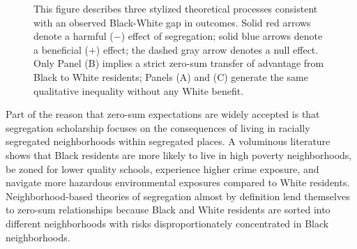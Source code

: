 \documentclass[11pt]{article}
\begin{document}
\begin{figure}[htbp]
{%
}
\caption{This figure describes three stylized theoretical processes consistent with an observed Black-White gap in outcomes. Solid red arrows denote a harmful ($-$) effect of segregation; solid blue arrows denote a beneficial ($+$) effect; the dashed gray arrow denotes a null effect. Only Panel (B) implies a strict zero-sum transfer of advantage from Black to White residents; Panels (A) and (C) generate the same qualitative inequality without any White benefit.}
\label{fig:zero-sum-processes}
\end{figure}

Part of the reason that zero-sum expectations are widely accepted is that segregation scholarship focuses on the consequences of living in racially segregated neighborhoods within segregated places. A voluminous literature shows that Black residents are more likely to live in high poverty neighborhoods, be zoned for lower quality schools, experience higher crime exposure, and navigate more hazardous environmental exposures \citep{wodtke_toxic_2022,elliott_historical_2013,massey_effect_1987,wilson_truly_1987,massey_american_1993,wodtke_are_2023,goldsmith_schools_2009,light_segregation_2019} compared to White residents. Neighborhood-based theories of segregation almost by definition lend themselves to zero-sum relationships because Black and White residents are sorted into different neighborhoods with risks disproportionately concentrated in Black neighborhoods.
\end{document}
